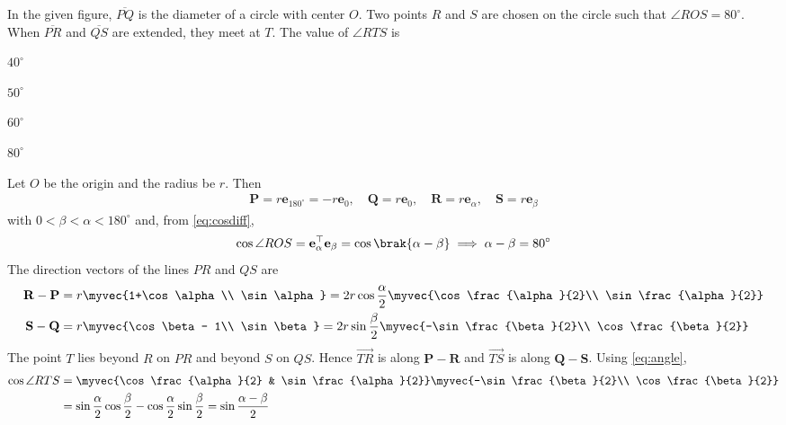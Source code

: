 \begin{enumerate}[label=1.2.\arabic*,leftmargin=*,labelsep=0.8em,itemsep=2ex]
\problem In the given figure, $\overline{PQ}$ is the diameter of a circle with center $O$. Two points $R$ and $S$ are chosen on the circle such that $\angle ROS = 80^\circ$. When $\overline{PR}$ and $\overline{QS}$ are extended, they meet at $T$. The value of $\angle RTS$ is \underline{\hspace{2cm}} \gate
\begin{options}
\item $40^\circ$
\item $50^\circ$
\item $60^\circ$
\item $80^\circ$
\end{options}
\solution Let $O$ be the origin and the radius be $r$. Then
\begin{align}
\mathbf{P} = r\mathbf{e}_{180^\circ} = -r\mathbf{e}_{0},\quad \mathbf{Q} = r\mathbf{e}_{0},\quad \mathbf{R} = r\mathbf{e}_\alpha,\quad \mathbf{S} = r\mathbf{e}_\beta
\end{align}
with $0 < \beta < \alpha < 180^\circ$ and, from \eqref{eq:cosdiff},
\begin{align}
\cos\angle ROS = \mathbf{e}_\alpha^\top\mathbf{e}_\beta = \cos\brak{\alpha-\beta} \implies \alpha - \beta = 80^\circ
\end{align}
The direction vectors of the lines $PR$ and $QS$ are
\begin{align}
\mathbf{R} - \mathbf{P} &= r\myvec{1+\cos\alpha\\ \sin\alpha} = 2r\cos\frac{\alpha}{2}\myvec{\cos\frac{\alpha}{2}\\ \sin\frac{\alpha}{2}}\\
\mathbf{S} - \mathbf{Q} &= r\myvec{\cos\beta - 1\\ \sin\beta} = 2r\sin\frac{\beta}{2}\myvec{-\sin\frac{\beta}{2}\\ \cos\frac{\beta}{2}}
\end{align}
The point $T$ lies beyond $R$ on $PR$ and beyond $S$ on $QS$. Hence $\overrightarrow{TR}$ is along $\mathbf{P} - \mathbf{R}$ and $\overrightarrow{TS}$ is along $\mathbf{Q} - \mathbf{S}$. Using \eqref{eq:angle},
\begin{align}
\cos\angle RTS &= \myvec{\cos\frac{\alpha}{2} & \sin\frac{\alpha}{2}}\myvec{-\sin\frac{\beta}{2}\\ \cos\frac{\beta}{2}}\\
&= \sin\frac{\alpha}{2}\cos\frac{\beta}{2} - \cos\frac{\alpha}{2}\sin\frac{\beta}{2} = \sin\frac{\alpha-\beta}{2}\\

\end{align}
\end{enumerate}
